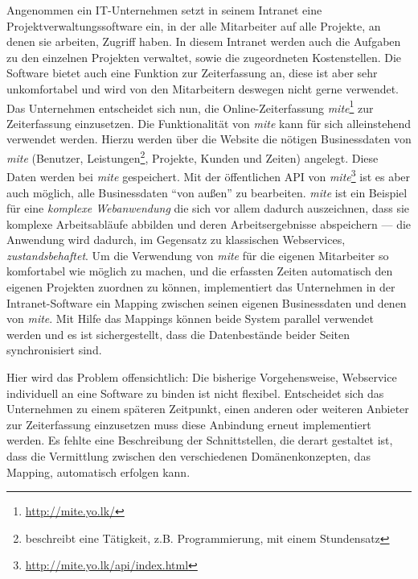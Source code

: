 Angenommen ein IT-Unternehmen setzt in seinem Intranet eine Projektverwaltungssoftware ein, in der alle Mitarbeiter auf alle Projekte, an denen sie arbeiten, Zugriff haben. In diesem Intranet werden auch die Aufgaben zu den einzelnen Projekten verwaltet, sowie die zugeordneten Kostenstellen. Die Software bietet auch eine Funktion zur Zeiterfassung an, diese ist aber sehr unkomfortabel und wird von den Mitarbeitern deswegen nicht gerne verwendet. Das Unternehmen entscheidet sich nun, die Online-Zeiterfassung  \emph{mite}\footnote{\url{http://mite.yo.lk/}} zur Zeiterfassung einzusetzen. Die Funktionalität von \emph{mite} kann für sich alleinstehend verwendet werden. Hierzu werden über die Website die nötigen Businessdaten von \emph{mite} (Benutzer, Leistungen\footnote{beschreibt eine Tätigkeit, z.B. Programmierung, mit einem Stundensatz}, Projekte, Kunden und Zeiten) angelegt. Diese Daten werden bei \emph{mite} gespeichert. Mit der öffentlichen \ac{API} von \emph{mite}\footnote{\url{http://mite.yo.lk/api/index.html}} ist es aber auch möglich, alle Businessdaten "`von außen"' zu bearbeiten. \emph{mite} ist ein Beispiel für eine \emph{komplexe Webanwendung} die sich vor allem dadurch auszeichnen, dass sie komplexe Arbeitsabläufe abbilden und deren Arbeitsergebnisse abspeichern --- die Anwendung wird dadurch, im Gegensatz zu klassischen Webservices, \emph{zustandsbehaftet}. Um die Verwendung von \emph{mite} für die eigenen Mitarbeiter so komfortabel wie möglich zu machen, und die erfassten Zeiten automatisch den eigenen Projekten zuordnen zu können, implementiert das Unternehmen in der Intranet-Software ein Mapping zwischen seinen eigenen Businessdaten und denen von \emph{mite}. Mit Hilfe das Mappings können beide System parallel verwendet werden und es ist sichergestellt, dass die Datenbestände beider Seiten synchronisiert sind. 

Hier wird das Problem offensichtlich: Die bisherige Vorgehensweise, Webservice individuell an eine Software zu binden ist nicht flexibel. Entscheidet sich das Unternehmen zu einem späteren Zeitpunkt, einen anderen oder weiteren Anbieter zur Zeiterfassung einzusetzen muss diese Anbindung erneut implementiert werden. Es fehlte eine Beschreibung der Schnittstellen, die derart gestaltet ist, dass die Vermittlung zwischen den verschiedenen Domänenkonzepten, das Mapping, automatisch erfolgen kann. 

